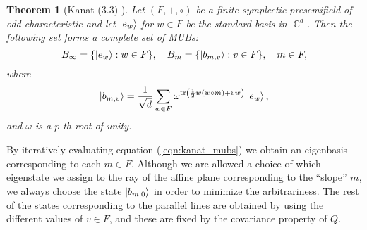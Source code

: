 \documentclass[a4paper, 11pt]{article}
\DeclareMathOperator{\C}{\mathbb{C}}
\DeclareMathOperator{\tr}{tr}
\newtheorem{theorem}{Theorem}
\begin{document}
  \begin{theorem}[Kanat (3.3) \cite{abdukhalikov2015}]
    Let $(F,+,\circ)$ be a finite symplectic presemifield of
    odd characteristic and let $\ket{e_w}$ for $w \in F$ be
    the standard basis in $\C^{d}$. Then the following set
    forms a complete set of MUBs:
    \begin{equation}
      B_\infty
      = \{\ket{e_w} : w \in F\},
      \quad
      B_m
      = \{\ket{b_{m,v}} : v \in F\},
      \quad m \in F,
    \end{equation}
    where
    \begin{equation}
      \label{eqn:kanat_mubs}
      \ket{b_{m,v}}
      = \frac{1}{\sqrt{d}} \sum_{w \in F}^{}
      \omega^{\tr\left( \frac{1}{2} w (w \circ m) + vw
      \right) } \ket{e_w},
    \end{equation}
    and $\omega$ is a $p$-th root of unity.
  \end{theorem}
  By iteratively evaluating equation (\ref{eqn:kanat_mubs})
  we obtain an eigenbasis corresponding to each $m \in F$.
  Although we are allowed a choice of which eigenstate we
  assign to the ray of the affine plane corresponding to the
  ``slope'' $m$, we always choose the state $\ket{b_{m,0}}$
  in order to minimize the arbitrariness. The rest of the
  states corresponding to the parallel lines are obtained by
  using the different values of $v \in F$, and these are
  fixed by the covariance property of $Q$.
\end{document}
